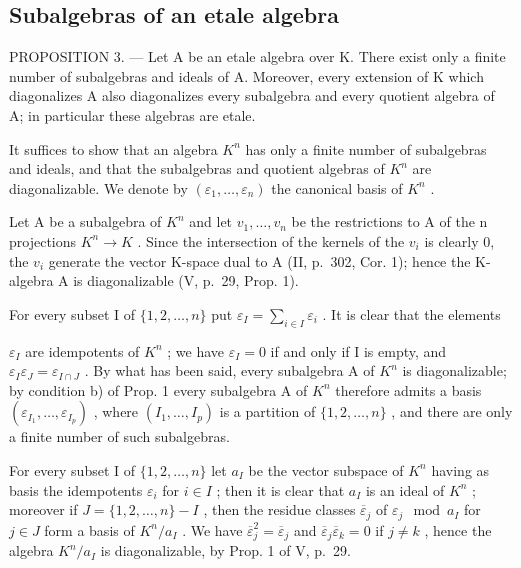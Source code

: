 \subsection{Subalgebras of an etale algebra}

PROPOSITION 3. --- Let A be an etale algebra over K. There exist only a finite number of subalgebras and ideals of A. Moreover, every extension of K which diagonalizes A also diagonalizes every subalgebra and every quotient algebra of A; in particular these algebras are etale.

It suffices to show that an algebra \(K^{n}\) has only a finite number of subalgebras and ideals, and that the subalgebras and quotient algebras of \(K^{n}\) are diagonalizable. We denote by \((\varepsilon_{1},\ldots,\varepsilon_{n})\) the canonical basis of \(K^{n}\) .

Let A be a subalgebra of \(K^{n}\) and let \(v_{1}, \ldots, v_{n}\) be the restrictions to A of the n projections \(K^{n} \rightarrow K\) . Since the intersection of the kernels of the \(v_{i}\) is clearly 0, the \(v_{i}\) generate the vector K-space dual to A (II, p.~302, Cor. 1); hence the K-algebra A is diagonalizable (V, p.~29, Prop. 1).

For every subset I of \(\{1, 2, \ldots, n\}\) put \(\varepsilon_{I} = \sum_{i \in I} \varepsilon_{i}\) . It is clear that the elements

\(\varepsilon_{I}\) are idempotents of \(K^{n}\) ; we have \(\varepsilon_{I}=0\) if and only if I is empty, and \(\varepsilon_{I}\varepsilon_{J}=\varepsilon_{I\cap J}\) . By what has been said, every subalgebra A of \(K^{n}\) is diagonalizable; by condition b) of Prop. 1 every subalgebra A of \(K^{n}\) therefore admits a basis \((\varepsilon_{I_{1}},\ldots,\varepsilon_{I_{p}})\) , where \((I_{1},\ldots,I_{p})\) is a partition of \(\{1,2,\ldots,n\}\) , and there are only a finite number of such subalgebras.

For every subset I of \(\{1,2,\ldots,n\}\) let \(a_{I}\) be the vector subspace of \(K^{n}\) having as basis the idempotents \(\varepsilon_{i}\) for \(i\in I\) ; then it is clear that \(a_{I}\) is an ideal of \(K^{n}\) ; moreover if \(J=\{1,2,\ldots,n\}-I\) , then the residue classes \(\overline{\varepsilon}_{j}\) of \(\varepsilon_{j} \mod a_{I}\) for \(j\in J\) form a basis of \(K^{n}/a_{I}\) . We have \(\overline{\varepsilon}_{j}^{2}=\overline{\varepsilon}_{j}\) and \(\overline{\varepsilon}_{j}\overline{\varepsilon}_{k}=0\) if \(j\neq k\) , hence the algebra \(K^{n}/a_{I}\) is diagonalizable, by Prop. 1 of V, p.~29.

